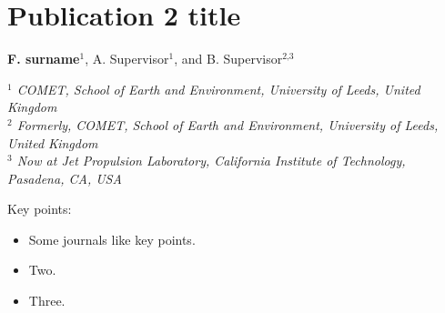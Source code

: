 \onehalfspacing
\chapter[Publication 2 title]{Publication 2 title}
\label{ch:publication2}
\begin{center}
 \large{\textbf{F. surname}$^{\text{1}}$, A. Supervisor$^{\text{1}}$, and B. Supervisor$^{\text{2,3}}$}  \\
\end{center}
\begin{center}
\textit{
$^{\text{1}}$ COMET, School of Earth and Environment, University of Leeds, United Kingdom\\
$^{\text{2}}$ Formerly, COMET, School of Earth and Environment, University of Leeds, United Kingdom\\
$^{\text{3}}$ Now at Jet Propulsion Laboratory, California Institute of Technology, Pasadena, CA, USA\\
}
\end{center}

\newpage
Key points:
\begin{itemize}
\item Some journals like key points.
\item Two.
\item Three.
\end{itemize}



